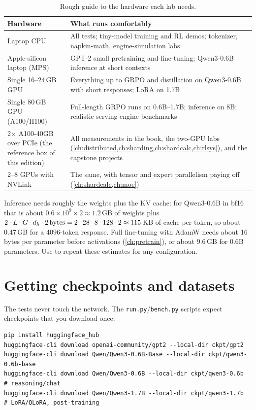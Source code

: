 \begin{table}[h]
\centering\small
\begin{tabularx}{\linewidth}{@{}lX@{}}
\toprule
\textbf{Hardware} & \textbf{What runs comfortably}\\
\midrule
Laptop CPU & All tests; tiny-model training and RL demos; tokenizer, napkin-math, engine-simulation labs\\
Apple-silicon laptop (MPS) & GPT-2 small pretraining and fine-tuning; Qwen3-0.6B inference at short contexts\\
Single 16--24\,GB GPU & Everything up to GRPO and distillation on Qwen3-0.6B with short responses; LoRA on 1.7B\\
Single 80\,GB GPU (A100/H100) & Full-length GRPO runs on 0.6B--1.7B; inference on 8B; realistic serving-engine benchmarks\\
2$\times$ A100-40GB over PCIe (the reference box of this edition) & All measurements in the book, the two-GPU labs (\cref{ch:distributed,ch:sharding,ch:shardcalc,ch:rlsys}), and the capstone projects\\
2--8 GPUs with NVLink & The same, with tensor and expert parallelism paying off (\cref{ch:shardcalc,ch:moe})\\
\bottomrule
\end{tabularx}
\caption{Rough guide to the hardware each lab needs.}
\end{table}

\begin{napkinmath}
Inference needs roughly the weights plus the KV cache: for Qwen3-0.6B in bf16 that is
about $0.6\times10^9\times 2\approx 1.2$\,GB of weights plus
$2\cdot L\cdot G\cdot d_{h}\cdot 2\,\text{bytes} = 2\cdot28\cdot8\cdot128\cdot2 \approx 115$\,KB
of cache per token, so about 0.47\,GB for a 4096-token response. Full fine-tuning with AdamW
needs about 16 bytes per parameter before activations (\cref{ch:pretrain}), or about 9.6\,GB for
0.6B parameters. Use  to repeat these estimates for any configuration.
\end{napkinmath}

\section{Getting checkpoints and datasets}

The tests never touch the network. The \texttt{run.py}/\texttt{bench.py} scripts expect
checkpoints that you download once:

\begin{lstlisting}[style=shell]
pip install huggingface_hub
huggingface-cli download openai-community/gpt2 --local-dir ckpt/gpt2
huggingface-cli download Qwen/Qwen3-0.6B-Base --local-dir ckpt/qwen3-0.6b-base
huggingface-cli download Qwen/Qwen3-0.6B --local-dir ckpt/qwen3-0.6b   # reasoning/chat
huggingface-cli download Qwen/Qwen3-1.7B --local-dir ckpt/qwen3-1.7b   # LoRA/QLoRA, post-training
\end{lstlisting}

